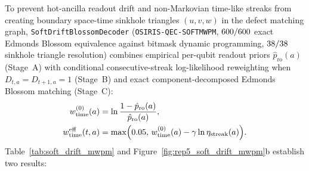\documentclass[aps,prx,twocolumn,superscriptaddress,nofootinbib]{revtex4-2}
\begin{document}
To prevent hot-ancilla readout drift and non-Markovian time-like streaks from creating boundary space-time sinkhole triangles $(u, v, w)$ in the defect matching graph, \texttt{SoftDriftBlossomDecoder} (\texttt{OSIRIS-QEC-SOFTMWPM}, $600/600$ exact Edmonds Blossom equivalence against bitmask dynamic programming, $38/38$ sinkhole triangle resolution) combines empirical per-qubit readout priors $\hat{p}_{\mathrm{ro}}(a)$ (Stage~A) with conditional consecutive-streak log-likelihood reweighting when $D_{t,a} = D_{t+1,a} = 1$ (Stage~B) and exact component-decomposed Edmonds Blossom matching (Stage~C):
\begin{align}
  w_{\mathrm{time}}^{(0)}(a) &= \ln\frac{1 - \hat{p}_{\mathrm{ro}}(a)}{\hat{p}_{\mathrm{ro}}(a)}, \nonumber\\
  w_{\mathrm{time}}^{\mathrm{eff}}(t, a) &= \max\Bigl(0.05,\, w_{\mathrm{time}}^{(0)}(a) - \gamma \ln \eta_{\mathrm{streak}}(a)\Bigr).
  \label{eq:soft_drift_blossom}
\end{align}
Table~\ref{tab:soft_drift_mwpm} and Figure~\ref{fig:rep5_soft_drift_mwpm}b establish two results:
\end{document}
